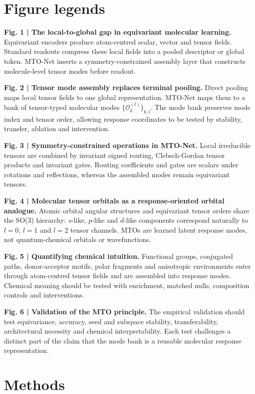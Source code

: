 \documentclass[11pt]{article}
\newcommand{\mto}{\mathcal{O}}
\begin{document}
\clearpage
\section*{Figure legends}

\textbf{Fig. 1 | The local-to-global gap in equivariant molecular learning.}
Equivariant encoders produce atom-centred scalar, vector and tensor fields. Standard readouts compress these local fields into a pooled descriptor or global token. MTO-Net inserts a symmetry-constrained assembly layer that constructs molecule-level tensor modes before readout.

\textbf{Fig. 2 | Tensor mode assembly replaces terminal pooling.}
Direct pooling maps local tensor fields to one global representation. MTO-Net maps them to a bank of tensor-typed molecular modes $\{\mto_k^{(l)}\}_{k,l}$. The mode bank preserves mode index and tensor order, allowing response coordinates to be tested by stability, transfer, ablation and intervention.

\textbf{Fig. 3 | Symmetry-constrained operations in MTO-Net.}
Local irreducible tensors are combined by invariant signed routing, Clebsch-Gordan tensor products and invariant gates. Routing coefficients and gates are scalars under rotations and reflections, whereas the assembled modes remain equivariant tensors.

\textbf{Fig. 4 | Molecular tensor orbitals as a response-oriented orbital analogue.}
Atomic orbital angular structures and equivariant tensor orders share the SO(3) hierarchy: $s$-like, $p$-like and $d$-like components correspond naturally to $l=0$, $l=1$ and $l=2$ tensor channels. MTOs are learned latent response modes, not quantum-chemical orbitals or wavefunctions.

\textbf{Fig. 5 | Quantifying chemical intuition.}
Functional groups, conjugated paths, donor-acceptor motifs, polar fragments and anisotropic environments enter through atom-centred tensor fields and are assembled into response modes. Chemical meaning should be tested with enrichment, matched nulls, composition controls and interventions.

\textbf{Fig. 6 | Validation of the MTO principle.}
The empirical validation should test equivariance, accuracy, seed and subspace stability, transferability, architectural necessity and chemical interpretability. Each test challenges a distinct part of the claim that the mode bank is a reusable molecular response representation.

\clearpage
\section*{Methods}
\end{document}
